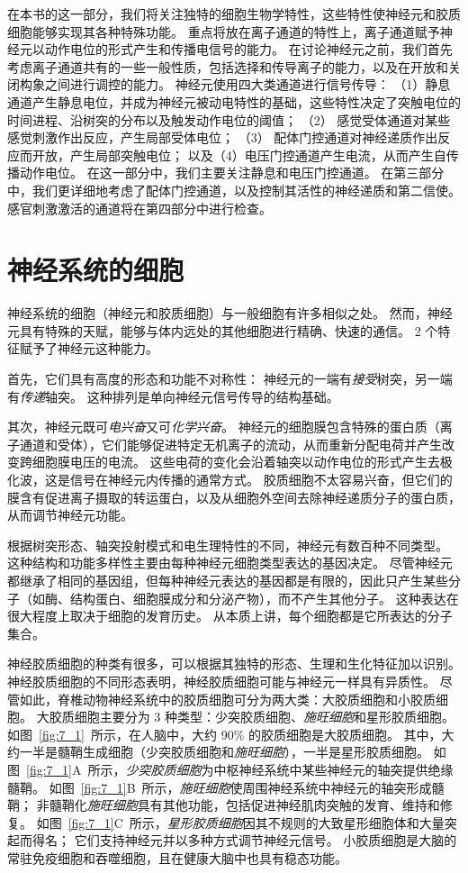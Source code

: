 在本书的这一部分，我们将关注独特的细胞生物学特性，这些特性使神经元和胶质细胞能够实现其各种特殊功能。
重点将放在离子通道的特性上，离子通道赋予神经元以动作电位的形式产生和传播电信号的能力。
在讨论神经元之前，我们首先考虑离子通道共有的一些一般性质，包括选择和传导离子的能力，以及在开放和关闭构象之间进行调控的能力。
神经元使用四大类通道进行信号传导：
（1）静息通道产生静息电位，并成为神经元被动电特性的基础，这些特性决定了突触电位的时间进程、沿树突的分布以及触发动作电位的阈值；
（2） 感觉受体通道对某些感觉刺激作出反应，产生局部受体电位；
（3） 配体门控通道对神经递质作出反应而开放，产生局部突触电位；
以及（4）电压门控通道产生电流，从而产生自传播动作电位。
在这一部分中，我们主要关注静息和电压门控通道。
在第三部分中，我们更详细地考虑了配体门控通道，以及控制其活性的神经递质和第二信使。
感官刺激激活的通道将在第四部分中进行检查。




\chapter{神经系统的细胞} \label{chap:chap7}

神经系统的细胞（神经元和胶质细胞）与一般细胞有许多相似之处。
然而，神经元具有特殊的天赋，能够与体内远处的其他细胞进行精确、快速的通信。
2 个特征赋予了神经元这种能力。


首先，它们具有高度的形态和功能不对称性：
神经元的一端有\textit{接受}树突，另一端有\textit{传递}轴突。
这种排列是单向神经元信号传导的结构基础。


其次，神经元既可\textit{电兴奋}又可\textit{化学兴奋}。
神经元的细胞膜包含特殊的蛋白质（离子通道和受体），它们能够促进特定无机离子的流动，从而重新分配电荷并产生改变跨细胞膜电压的电流。
这些电荷的变化会沿着轴突以动作电位的形式产生去极化波，这是信号在神经元内传播的通常方式。
胶质细胞不太容易兴奋，但它们的膜含有促进离子摄取的转运蛋白，以及从细胞外空间去除神经递质分子的蛋白质，从而调节神经元功能。


根据树突形态、轴突投射模式和电生理特性的不同，神经元有数百种不同类型。
这种结构和功能多样性主要由每种神经元细胞类型表达的基因决定。
尽管神经元都继承了相同的基因组，但每种神经元表达的基因都是有限的，因此只产生某些分子（如酶、结构蛋白、细胞膜成分和分泌产物），而不产生其他分子。
这种表达在很大程度上取决于细胞的发育历史。
从本质上讲，每个细胞都是它所表达的分子集合。


神经胶质细胞的种类有很多，可以根据其独特的形态、生理和生化特征加以识别。
神经胶质细胞的不同形态表明，神经胶质细胞可能与神经元一样具有异质性。
尽管如此，脊椎动物神经系统中的胶质细胞可分为两大类：大胶质细胞和小胶质细胞。
大胶质细胞主要分为 3 种类型：少突胶质细胞、\textit{施旺细胞}和星形胶质细胞。
如图~\ref{fig:7_1}~所示，在人脑中，大约 90\% 的胶质细胞是大胶质细胞。
其中，大约一半是髓鞘生成细胞（少突胶质细胞和\textit{施旺细胞}），一半是星形胶质细胞。
如图~\ref{fig:7_1}A~所示，\textit{少突胶质细胞}为中枢神经系统中某些神经元的轴突提供绝缘髓鞘。
如图~\ref{fig:7_1}B~所示，\textit{施旺细胞}使周围神经系统中神经元的轴突形成髓鞘；
非髓鞘化\textit{施旺细胞}具有其他功能，包括促进神经肌肉突触的发育、维持和修复。
如图~\ref{fig:7_1}C~所示，\textit{星形胶质细胞}因其不规则的大致星形细胞体和大量突起而得名；
它们支持神经元并以多种方式调节神经元信号。 
小胶质细胞是大脑的常驻免疫细胞和吞噬细胞，且在健康大脑中也具有稳态功能。


